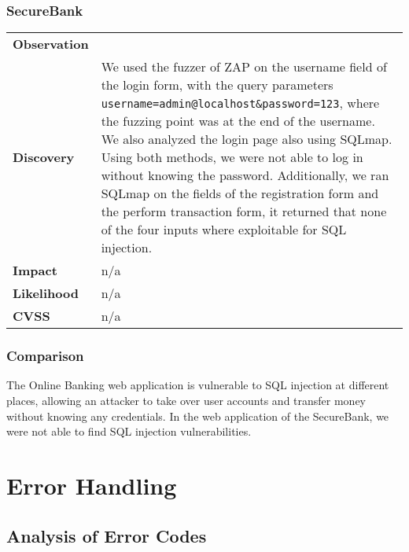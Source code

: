 \subsubsection*{SecureBank}
\begin{tabular}{l|p{10cm}}

\textbf{Observation} &  \\
\textbf{Discovery} & We used the fuzzer of ZAP on the username field of the login form, with the query parameters \texttt{username=admin@localhost\&password=123}, where the fuzzing point was at the end of the username. We also analyzed the login page also using SQLmap. Using both methods, we were not able to log in without knowing the password. Additionally, we ran SQLmap on the fields of the registration form and the perform transaction form, it returned that none of the four inputs where exploitable for SQL injection. \\
\textbf{Impact} & n/a \\
\textbf{Likelihood} & n/a \\
\textbf{CVSS} & n/a \\
\end{tabular}

\subsubsection*{Comparison}
The Online Banking web application is vulnerable to SQL injection at different places, allowing an attacker to take over user accounts and transfer money without knowing any credentials. In the web application of the SecureBank, we were not able to find SQL injection vulnerabilities.

\clearpage



\section{Error Handling}

\subsection{Analysis of Error Codes}
